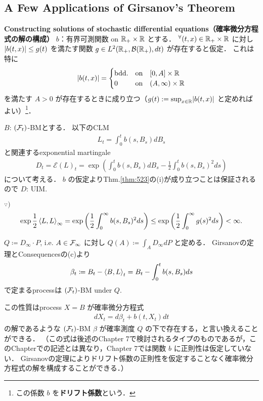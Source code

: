 \documentclass{jsarticle}
\begin{document}
\subsection{A Few Applications of Girsanov's Theorem}

\textbf{Constructing solutions of stochastic differential equations（確率微分方程式の解の構成）}
$b$：有界可測関数 on $\mathbb{R}_+\times\mathbb{R}$ とする．
${}^{\forall} (t,x)\in\mathbb{R}_+\times\mathbb{R}$ に対し $\lvert b(t,x)\rvert\le g(t)$ を満たす関数 $g\in L^2(\mathbb{R}_+,\mathcal{B}(\mathbb{R}_+),dt)$ が存在すると仮定．
これは特に
\begin{align}
    \lvert b(t,x)\rvert=
    \begin{cases}
        \text{bdd.} &\text{on}\quad [0,A]\times\mathbb{R} \\
        0 &\text{on}\quad (A,\infty)\times\mathbb{R}
    \end{cases}
\end{align}
を満たす $A>0$ が存在するときに成り立つ（$g(t):=\sup_{x\in\mathbb{R}}\lvert b(t,x)\rvert$ と定めればよい）\footnote{この係数 $b$ を\textbf{ドリフト係数}という．}．

$B$: $(\mathcal{F}_t)$-BMとする．
以下のCLM
\begin{align}
    L_t=\int_0^t b(s,B_s)dB_s
\end{align}
と関連するexponential martingale
\begin{align}
    D_t
    = \mathcal{E}(L)_t
    = \exp\left(\int_0^t b(s,B_s)dB_s-\frac{1}{2}\int_0^t b(s,B_s)^2 ds\right)
\end{align}
について考える．
$b$ の仮定よりThm.\ref{thm:523}の(i)が成り立つことは保証されるので $D$: UIM.

\begin{screen}
    $\because)$
    \begin{align}
        \exp\frac{1}{2}\left\langle L,L\right\rangle_\infty
        = \exp\left(\frac{1}{2}\int_0^\infty b(s,B_s)^2 ds\right)
        \le \exp\left(\frac{1}{2}\int_0^\infty g(s)^2 ds\right)
        < \infty.
    \end{align}
\end{screen}

$Q\coloneqq D_\infty\cdot P$, i.e. $A\in\mathcal{F}_\infty$ に対し $Q(A)\coloneqq\int_A D_\infty dP$ と定める．
Girsanovの定理とConsequencesの(c)より
\begin{align}
    \beta_t
    \coloneqq B_t-\left\langle B,L\right\rangle_t
    = B_t-\int_0^t b(s,B_s)ds
\end{align}
で定まるprocessは $(\mathcal{F}_t)$-BM under $Q.$

この性質はprocess $X=B$ が確率微分方程式
\begin{align}
    dX_t=d\beta_t+b(t,X_t)dt
\end{align}
の解であるような $(\mathcal{F}_t)$-BM $\beta$ が確率測度 $Q$ の下で存在する，と言い換えることができる．
（この式は後述のChapter 7で検討されるタイプのものであるが，このChapterでの記述とは異なり，Chapter 7では関数 $b$ に正則性は仮定していない．
Girsanovの定理によりドリフト係数の正則性を仮定することなく確率微分方程式の解を構成することができる．）
\end{document}
